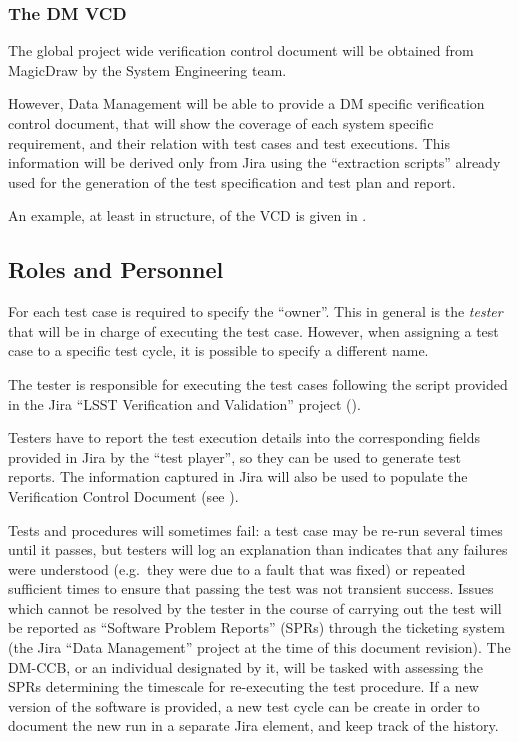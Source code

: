 \subsubsection{The DM VCD}

The global project wide verification control document will be obtained from MagicDraw by the System Engineering team.

However, Data Management will be able to provide a DM specific verification control document, that will show the coverage of each system specific requirement, and their relation with test cases and test executions.
This information will be derived only from Jira using the ``extraction scripts'' already used for the generation of the test specification and test plan and report.

An example, at least in structure, of the VCD is given in .



\subsection{Roles and Personnel}
\label{sect:roles}


For each test case is required to specify the ``owner''.
This in general is the \emph{tester} that will be in charge of executing the test case.
However, when assigning a test case to a specific test cycle, it is possible to specify a different name.

The tester is responsible for executing the test cases following the script provided in the Jira ``LSST Verification and Validation'' project ().

Testers have to report the test execution details into the corresponding fields provided in Jira by the ``test player'',  so they can be used to generate test reports.
The information captured in Jira will also be used to populate the Verification Control Document (see ).

Tests and procedures will sometimes fail: a test case may be re-run several times until it passes, but testers will log an explanation than indicates that any failures were understood (e.g.\ they were due to a fault that was fixed) or repeated sufficient times to ensure that passing the test was not transient success.
Issues which cannot be resolved by the tester in the course of carrying out the test will be reported as ``Software Problem Reports'' (SPRs) through the \product{} ticketing system (the Jira ``Data Management'' project at the time of this document revision).
The DM-CCB, or an individual designated by it, will be tasked with assessing the SPRs determining the timescale for re-executing the test procedure.
If a new version of the software is provided, a new test cycle can be create in order to document the new run in a separate Jira element, and keep track of the history.


